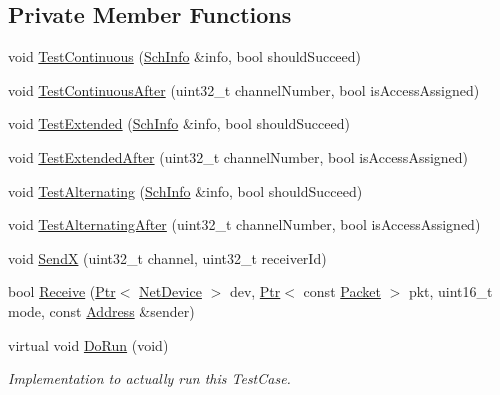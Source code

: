 \subsection*{Private Member Functions}
\begin{DoxyCompactItemize}
\item 
void \hyperlink{classChannelAccessTestCase_ae5e346e49aa60f74439c2f2db2030d08}{Test\+Continuous} (\hyperlink{structns3_1_1SchInfo}{Sch\+Info} \&info, bool should\+Succeed)
\item 
void \hyperlink{classChannelAccessTestCase_ab9dcdeeb2318a3a44a4a2680ade3a6e1}{Test\+Continuous\+After} (uint32\+\_\+t channel\+Number, bool is\+Access\+Assigned)
\item 
void \hyperlink{classChannelAccessTestCase_aeacbe5638af4e2b93a53229020abd796}{Test\+Extended} (\hyperlink{structns3_1_1SchInfo}{Sch\+Info} \&info, bool should\+Succeed)
\item 
void \hyperlink{classChannelAccessTestCase_a9578cc501b608d9772c3ded4e6619c17}{Test\+Extended\+After} (uint32\+\_\+t channel\+Number, bool is\+Access\+Assigned)
\item 
void \hyperlink{classChannelAccessTestCase_a0a581ae6f9c8e9f1317bdcf7e0e95936}{Test\+Alternating} (\hyperlink{structns3_1_1SchInfo}{Sch\+Info} \&info, bool should\+Succeed)
\item 
void \hyperlink{classChannelAccessTestCase_a1cddefa81cd70fd30ccdfe826ac4e85f}{Test\+Alternating\+After} (uint32\+\_\+t channel\+Number, bool is\+Access\+Assigned)
\item 
void \hyperlink{classChannelAccessTestCase_a372d321c372c644c86ff355e94704eaf}{SendX} (uint32\+\_\+t channel, uint32\+\_\+t receiver\+Id)
\item 
bool \hyperlink{classChannelAccessTestCase_ae5b3299c80154aa10c3775bfc4f8c0ab}{Receive} (\hyperlink{classns3_1_1Ptr}{Ptr}$<$ \hyperlink{classns3_1_1NetDevice}{Net\+Device} $>$ dev, \hyperlink{classns3_1_1Ptr}{Ptr}$<$ const \hyperlink{classns3_1_1Packet}{Packet} $>$ pkt, uint16\+\_\+t mode, const \hyperlink{classns3_1_1Address}{Address} \&sender)
\item 
virtual void \hyperlink{classChannelAccessTestCase_ad3169383a172cbaf1ed6b94adbe9d33a}{Do\+Run} (void)
\begin{DoxyCompactList}\small\item\em Implementation to actually run this Test\+Case. \end{DoxyCompactList}\end{DoxyCompactItemize}
